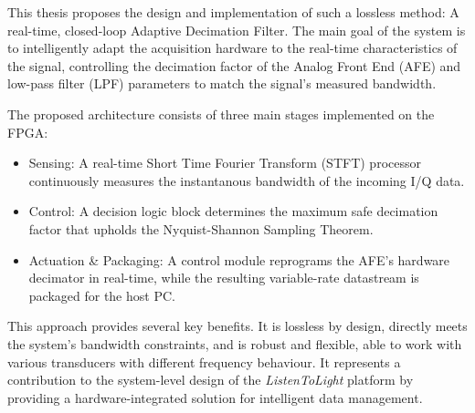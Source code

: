 


This thesis proposes the design and implementation of such a lossless method: A real-time, closed-loop Adaptive Decimation Filter. The main goal of the system is to intelligently adapt the acquisition hardware to the real-time characteristics of the signal, controlling the decimation factor of the Analog Front End (AFE) and low-pass filter (LPF) parameters to match the signal's measured bandwidth.

The proposed architecture consists of three main stages implemented on the FPGA:

\begin{itemize}
  \item Sensing: A real-time Short Time Fourier Transform (STFT) processor continuously measures the instantanous bandwidth of the incoming I/Q data.
  \item Control: A decision logic block determines the maximum safe decimation factor that upholds the Nyquist-Shannon Sampling Theorem.
  \item Actuation \& Packaging: A control module reprograms the AFE's hardware decimator in real-time, while the resulting variable-rate datastream is packaged for the host PC.
\end{itemize}

This approach provides several key benefits. It is lossless by design, directly meets the system's bandwidth constraints, and is robust and flexible, able to work with various transducers with different frequency behaviour. It represents a contribution to the system-level design of the \textit{ListenToLight} platform by providing a hardware-integrated solution for intelligent data management.


